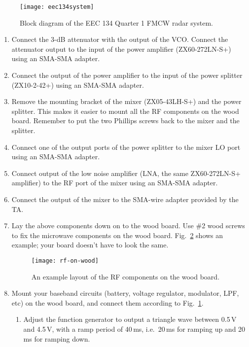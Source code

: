 \documentclass[letterpaper, 11pt]{article}
\begin{document}
\begin{figure}[ht]
	\centering
	\texttt{[image: eec134system]} %
	\caption{Block diagram of the EEC 134 Quarter 1 FMCW radar system.}
	\label{fig:eec134system}
\end{figure}

\begin{enumerate}
	\item Connect the 3-dB attenuator with the output of the VCO. Connect the attenuator output to the input of the power amplifier (ZX60-272LN-S+) using an SMA-SMA adapter. 
	
	\item Connect the output of the power amplifier to the input of the power splitter (ZX10-2-42+) using an SMA-SMA adapter. 
	
	\item Remove the mounting bracket of the mixer (ZX05-43LH-S+) and the power splitter. This makes it easier to mount all the RF components on the wood board. Remember to put the two Phillips screws back to the mixer and the splitter. %
	
	\item Connect one of the output ports of the power splitter to the mixer LO port using an SMA-SMA adapter.  
	
	\item Connect output of the low noise amplifier (LNA, the same ZX60-272LN-S+ amplifier) to the RF port of the mixer using an SMA-SMA adapter.
	
	\item Connect the output of the mixer to the SMA-wire adapter provided by the TA.
	
	\item Lay the above components down on to the wood board. Use \#2 wood screws to fix the microwave components on the wood board. Fig.~\ref{fig:rf-on-wood} shows an example; your board doesn't have to look the same. 
	
	\begin{figure}[h]
		\centering
		\texttt{[image: rf-on-wood]}
		\caption{An example layout of the RF components on the wood board.}
		\label{fig:rf-on-wood}
	\end{figure} 
	
	\item Mount your baseband circuits (battery, voltage regulator, modulator, LPF, etc) on the wood board, and connect them according to Fig.~\ref{fig:eec134system}. 
		\begin{enumerate}
			\item Adjust the function generator to output a triangle wave between 0.5\,V and 4.5\,V, with a ramp period of 40\,ms, i.e.~20\,ms for ramping up and 20\,ms for ramping down.
		\end{enumerate}
	

\end{enumerate}
\end{document}
